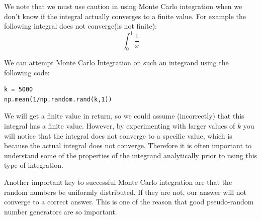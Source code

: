 We note that we must use caution in using Monte Carlo integration when we don't know if the integral actually converges to a finite value. 
For example the following integral does not converge(is not finite):
\[
\int_0^1 \frac{1}{x}
\]

We can attempt Monte Carlo Integration on such an integrand using the following code:
\begin{lstlisting}
k = 5000
np.mean(1/np.random.rand(k,1))
\end{lstlisting}

We will get a finite value in return, so we could assume (incorrectly) that this integral has a finite value.
However, by experimenting with larger values of $k$ you will notice that the integral does not converge to a specific value, which is because the actual integral does not converge. 
Therefore it is often important to understand some of the properties of the integrand analytically prior to using this type of integration.

Another important key to successful Monte Carlo integration are that the random numbers be uniformly distributed. 
If they are not, our answer will not converge to a correct answer. 
This is one of the reason that good pseudo-random number generators are so important.

